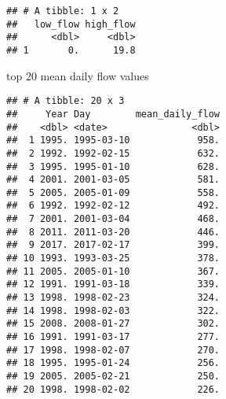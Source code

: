 \documentclass[]{article}
\newenvironment{Shaded}{\begin{snugshade}}{\end{snugshade}}
\newcommand{\KeywordTok}[1]{\textcolor[rgb]{0.13,0.29,0.53}{\textbf{{#1}}}}
\newcommand{\DataTypeTok}[1]{\textcolor[rgb]{0.13,0.29,0.53}{{#1}}}
\newcommand{\DecValTok}[1]{\textcolor[rgb]{0.00,0.00,0.81}{{#1}}}
\newcommand{\FloatTok}[1]{\textcolor[rgb]{0.00,0.00,0.81}{{#1}}}
\newcommand{\StringTok}[1]{\textcolor[rgb]{0.31,0.60,0.02}{{#1}}}
\newcommand{\OtherTok}[1]{\textcolor[rgb]{0.56,0.35,0.01}{{#1}}}
\newcommand{\NormalTok}[1]{{#1}}
\begin{document}
\begin{Shaded}
\end{Shaded}

\begin{verbatim}
## # A tibble: 1 x 2
##   low_flow high_flow
##      <dbl>     <dbl>
## 1       0.      19.8
\end{verbatim}

top 20 mean daily flow values

\begin{Shaded}
\end{Shaded}

\begin{verbatim}
## # A tibble: 20 x 3
##     Year Day        mean_daily_flow
##    <dbl> <date>               <dbl>
##  1 1995. 1995-03-10            958.
##  2 1992. 1992-02-15            632.
##  3 1995. 1995-01-10            628.
##  4 2001. 2001-03-05            581.
##  5 2005. 2005-01-09            558.
##  6 1992. 1992-02-12            492.
##  7 2001. 2001-03-04            468.
##  8 2011. 2011-03-20            446.
##  9 2017. 2017-02-17            399.
## 10 1993. 1993-03-25            378.
## 11 2005. 2005-01-10            367.
## 12 1991. 1991-03-18            339.
## 13 1998. 1998-02-23            324.
## 14 1998. 1998-02-03            322.
## 15 2008. 2008-01-27            302.
## 16 1991. 1991-03-17            277.
## 17 1998. 1998-02-07            270.
## 18 1995. 1995-01-24            256.
## 19 2005. 2005-02-21            250.
## 20 1998. 1998-02-02            226.
\end{verbatim}
\end{document}
